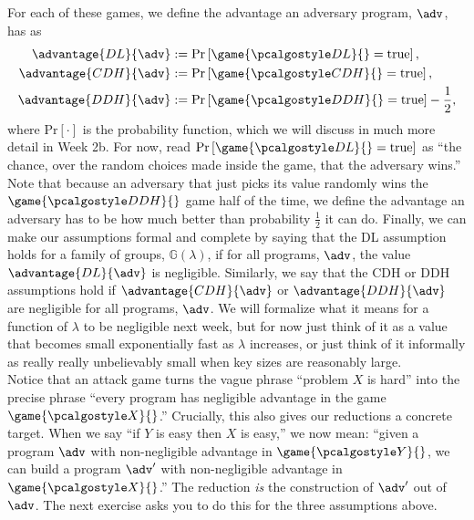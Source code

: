 \documentclass[12pt]{article}
\newcommand{\G}[0]{\mathbb{G}}
\newcommand{\pr}[1]{\text{Pr}\left[#1\right]}
\theoremstyle{definition}
\theoremstyle{remark}
\theoremstyle{definition}
\begin{document}
For each of these games, we define the advantage an adversary program, $\adv$, has as
\begin{align*}
\advantage{DL}{\adv} &:= \pr{\game{\algo{DL}}{} = \text{true}},\\
\advantage{CDH}{\adv} &:= \pr{\game{\algo{CDH}}{} = \text{true}},\\
\advantage{DDH}{\adv} &:= \pr{\game{\algo{DDH}}{} = \text{true}} - \frac{1}{2},
\end{align*} where $\pr{\cdot}$ is the probability function, which we will discuss in much more detail in Week 2b. For now, read $\pr{\game{\algo{DL}}{} = \text{true}}$ as ``the chance, over the random choices made inside the game, that the adversary wins.'' Note that because an adversary that just picks its value randomly wins the $\game{\algo{DDH}}{}$ game half of the time, we define the advantage an adversary has to be how much better than probability $\frac{1}{2}$ it can do. Finally, we can make our assumptions formal and complete by saying that the DL assumption holds for a family of groups, $\G(\lambda)$, if for all programs, $\adv$, the value $\advantage{DL}{\adv}$ is negligible. Similarly, we say that the CDH or DDH assumptions hold if $\advantage{CDH}{\adv}$ or $\advantage{DDH}{\adv}$ are negligible for all programs, $\adv$. We will formalize what it means for a function of $\lambda$ to be negligible next week, but for now just think of it as a value that becomes small exponentially fast as $\lambda$ increases, or just think of it informally as really really unbelievably small when key sizes are reasonably large.\\

Notice that an attack game turns the vague phrase ``problem $X$ is hard'' into the precise phrase ``every program has negligible advantage in the game $\game{\algo{X}}{}$.'' Crucially, this also gives our reductions a concrete target. When we say ``if $Y$ is easy then $X$ is easy,'' we now mean: ``given a program $\adv$ with non-negligible advantage in $\game{\algo{Y}}{}$, we can build a program $\adv'$ with non-negligible advantage in $\game{\algo{X}}{}$.'' The reduction \emph{is} the construction of $\adv'$ out of $\adv$. The next exercise asks you to do this for the three assumptions above.
\end{document}
